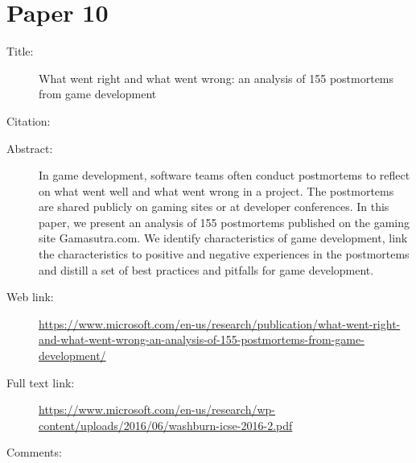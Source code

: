 \documentclass{scrartcl}
\begin{document}
\section*{Paper 10}
\begin{description}
\item[Title:]What went right and what went wrong: an analysis of 155 postmortems from game development
\item[Citation:] \cite{whatwentright2016t}
\item[Abstract:] In game development, software teams often conduct postmortems to reflect on what went well and what went wrong in a project. The postmortems are shared publicly on gaming sites or at developer conferences. In this paper, we present an analysis of 155 postmortems published on the gaming site Gamasutra.com. We identify characteristics of game development, link the characteristics to positive and negative experiences in the postmortems and distill a set of best practices and pitfalls for game development.
\item[Web link:]\url  {https://www.microsoft.com/en-us/research/publication/what-went-right-and-what-went-wrong-an-analysis-of-155-postmortems-from-game-development/}
\item[Full text link:]\url  {https://www.microsoft.com/en-us/research/wp-content/uploads/2016/06/washburn-icse-2016-2.pdf}
\item[Comments:] 
\end{description}
\end{document}

